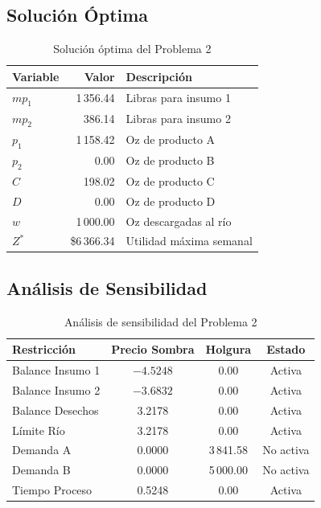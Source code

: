 \documentclass[12pt,a4paper]{article}
\begin{document}
\subsection{Solución Óptima}

\begin{table}[h]
\centering
\begin{tabular}{lrl}
\toprule
\textbf{Variable} & \textbf{Valor} & \textbf{Descripción} \\
\midrule
$mp_1$ & 1\,356.44 & Libras para insumo 1 \\
$mp_2$ & 386.14 & Libras para insumo 2 \\
$p_1$ & 1\,158.42 & Oz de producto A \\
$p_2$ & 0.00 & Oz de producto B \\
$C$ & 198.02 & Oz de producto C \\
$D$ & 0.00 & Oz de producto D \\
$w$ & 1\,000.00 & Oz descargadas al río \\
$Z^*$ & \$6\,366.34 & Utilidad máxima semanal \\
\bottomrule
\end{tabular}
\caption{Solución óptima del Problema 2}
\end{table}

\subsection{Análisis de Sensibilidad}

\begin{table}[h]
\centering
\begin{tabular}{lccc}
\toprule
\textbf{Restricción} & \textbf{Precio Sombra} & \textbf{Holgura} & \textbf{Estado} \\
\midrule
Balance Insumo 1 & $-4.5248$ & 0.00 & Activa \\
Balance Insumo 2 & $-3.6832$ & 0.00 & Activa \\
Balance Desechos & 3.2178 & 0.00 & Activa \\
Límite Río & 3.2178 & 0.00 & Activa \\
Demanda A & 0.0000 & 3\,841.58 & No activa \\
Demanda B & 0.0000 & 5\,000.00 & No activa \\
Tiempo Proceso & 0.5248 & 0.00 & Activa \\
\bottomrule
\end{tabular}
\caption{Análisis de sensibilidad del Problema 2}
\end{table}
\end{document}
